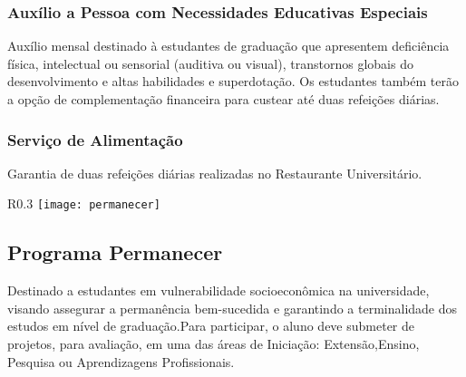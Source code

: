     \subsubsection{Auxílio a Pessoa com Necessidades Educativas Especiais}
        Auxílio mensal destinado à estudantes de graduação que apresentem deficiência física, intelectual ou sensorial (auditiva ou visual), transtornos globais do desenvolvimento e altas habilidades e superdotação.  Os estudantes também terão a opção de complementação financeira para custear até duas refeições diárias.
    \subsubsection{Serviço de Alimentação}
        Garantia de duas refeições diárias realizadas no Restaurante Universitário.
\begin{wrapfigure}{R}{0.3\textwidth}
    \centering
    \texttt{[image: permanecer]}
\end{wrapfigure}
\subsection{Programa Permanecer}
        Destinado a estudantes em vulnerabilidade socioeconômica na universidade, visando assegurar a permanência bem-sucedida e garantindo a terminalidade dos estudos em nível de graduação.Para participar, o aluno deve submeter de projetos, para avaliação, em uma das áreas de Iniciação: Extensão,Ensino, Pesquisa ou Aprendizagens Profissionais. 